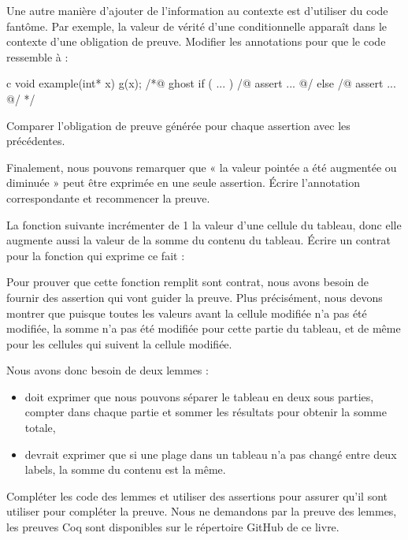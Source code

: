 Une autre manière d'ajouter de l'information au contexte est d'utiliser du
code fantôme. Par exemple, la valeur de vérité d'une conditionnelle apparaît
dans le contexte d'une obligation de preuve. Modifier les annotations pour que
le code ressemble à :


\begin{CodeBlock}{c}
void example(int* x){
  g(x);
  /*@ ghost
   if ( ... ){
    /@ assert ... @/
   } else {
    /@ assert ... @/
   }
  */
}
\end{CodeBlock}

Comparer l'obligation de preuve générée pour chaque assertion avec les précédentes.


Finalement, nous pouvons remarquer que « la valeur pointée a été augmentée ou
diminuée » peut être exprimée en une seule assertion. Écrire l'annotation
correspondante et recommencer la preuve.


\label{l4:proof-methodologies-triggering-lemmas-exercises-sum}


La fonction suivante incrémenter de 1 la valeur d'une cellule du tableau, donc
elle augmente aussi la valeur de la somme du contenu du tableau. Écrire un contrat
pour la fonction qui exprime ce fait :




Pour prouver que cette fonction remplit sont contrat, nous avons besoin de fournir
des assertion qui vont guider la preuve. Plus précisément, nous devons montrer que
puisque toutes les valeurs avant la cellule modifiée n'a pas été modifiée, la somme
n'a pas été modifiée pour cette partie du tableau, et de même pour les cellules qui
suivent la cellule modifiée.


Nous avons donc besoin de deux lemmes :

\begin{itemize}
    \item {} doit exprimer que nous pouvons séparer le
          tableau en deux sous parties, compter dans chaque partie et sommer les
          résultats pour obtenir la somme totale,
    \item {} devrait exprimer que si une plage dans un
          tableau n'a pas changé entre deux labels, la somme du contenu est la
          même.
\end{itemize}


Compléter les code des lemmes et utiliser des assertions pour assurer qu'il sont
utiliser pour compléter la preuve. Nous ne demandons par la preuve des lemmes, les
preuves Coq sont disponibles sur le répertoire GitHub de ce livre.
